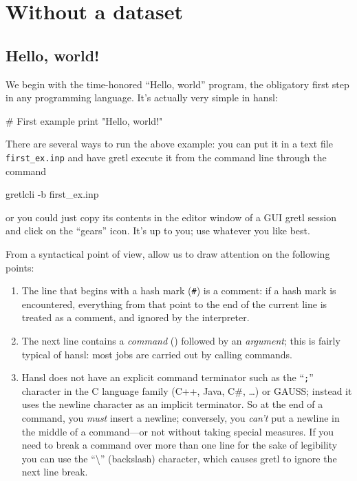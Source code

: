 \part{Without a dataset}

\chapter{Hello, world!}

We begin with the time-honored ``Hello, world'' program, the
obligatory first step in any programming language. It's actually very
simple in hansl:
\begin{code}
  # First example
  print "Hello, world!"
\end{code}

There are several ways to run the above example: you can put it in a
text file \texttt{first\_ex.inp} and have gretl execute it from the
command line through the command
\begin{code}
  gretlcli -b first_ex.inp
\end{code}
or you could just copy its contents in the editor window of a GUI
gretl session and click on the ``gears'' icon. It's up to you; use
whatever you like best.

From a syntactical point of view, allow us to draw attention on
the following points:
\begin{enumerate}
\item The line that begins with a hash mark (\texttt{\#}) is a
  comment: if a hash mark is encountered, everything from that point
  to the end of the current line is treated as a comment, and ignored
  by the interpreter.
\item The next line contains a \emph{command} () followed
  by an \emph{argument}; this is fairly typical of hansl: most jobs
  are carried out by calling commands.
\item Hansl does not have an explicit command terminator such as the
  ``\texttt{;}'' character in the C language family (C++, Java, C\#,
  \ldots) or GAUSS; instead it uses the newline character as an
  implicit terminator. So at the end of a command, you \emph{must}
  insert a newline; conversely, you \emph{can't} put a newline in the
  middle of a command---or not without taking special measures. If you
  need to break a command over more than one line for the sake of
  legibility you can use the ``\textbackslash'' (backslash) character,
  which causes gretl to ignore the next line break.
\end{enumerate}

